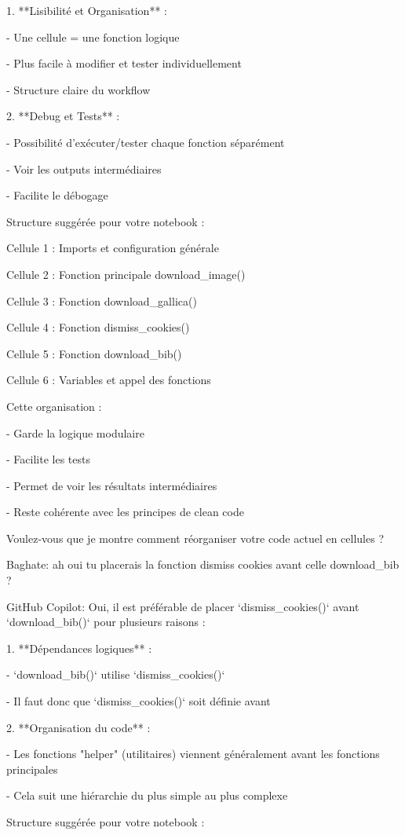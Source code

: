 1. **Lisibilité et Organisation** :

- Une cellule = une fonction logique

- Plus facile à modifier et tester individuellement

- Structure claire du workflow

2. **Debug et Tests** :

- Possibilité d'exécuter/tester chaque fonction séparément

- Voir les outputs intermédiaires

- Facilite le débogage


Structure suggérée pour votre notebook :


Cellule 1 : Imports et configuration générale

Cellule 2 : Fonction principale download\_image()

Cellule 3 : Fonction download\_gallica()

Cellule 4 : Fonction dismiss\_cookies()

Cellule 5 : Fonction download\_bib()

Cellule 6 : Variables et appel des fonctions

Cette organisation :

- Garde la logique modulaire

- Facilite les tests

- Permet de voir les résultats intermédiaires

- Reste cohérente avec les principes de clean code

Voulez-vous que je montre comment réorganiser votre code actuel en cellules ?

Baghate: ah oui tu placerais la fonction dismiss cookies avant celle download\_bib ?

GitHub Copilot: Oui, il est préférable de placer `dismiss\_cookies()` avant `download\_bib()` pour plusieurs raisons :

1. **Dépendances logiques** :

- `download\_bib()` utilise `dismiss\_cookies()`

- Il faut donc que `dismiss\_cookies()` soit définie avant

2. **Organisation du code** :

- Les fonctions "helper" (utilitaires) viennent généralement avant les fonctions principales

- Cela suit une hiérarchie du plus simple au plus complexe

Structure suggérée pour votre notebook :

